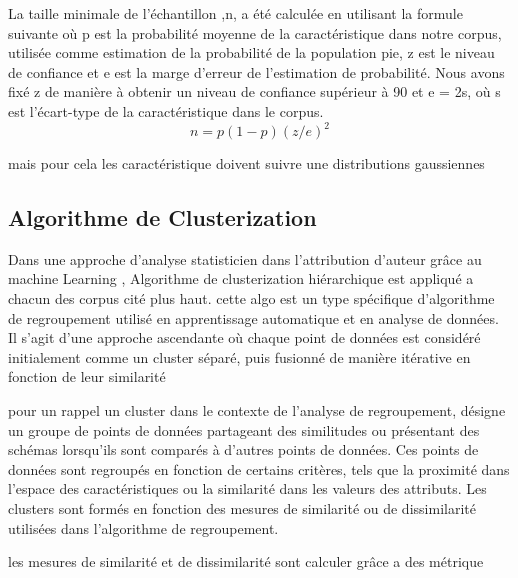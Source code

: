 \documentclass[]{report}
\begin{document}
    La taille minimale de l'échantillon ,n, a été calculée en utilisant la formule suivante
où p est la probabilité moyenne de la caractéristique dans notre corpus, 
utilisée comme estimation de la probabilité de la population pie, 
z est le niveau de confiance et 
e est la marge d'erreur de l'estimation de probabilité.
Nous avons fixé z de manière à obtenir un niveau de confiance supérieur à 90 et 
e = 2s, où s est l'écart-type de la caractéristique dans le corpus.
\[n=p(1-p)(z/e)^2\]

mais pour cela les caractéristique doivent suivre une distributions gaussiennes
\subsection{ Algorithme de Clusterization}

Dans une approche d'analyse statisticien dans l’attribution d’auteur grâce au machine Learning , Algorithme de clusterization hiérarchique est appliqué a chacun des corpus cité plus haut.
cette algo est un type spécifique d'algorithme de regroupement utilisé en apprentissage automatique et en analyse de données. Il s'agit d'une approche ascendante où chaque point de données est considéré initialement comme un cluster séparé, puis fusionné de manière itérative en fonction de leur similarité

pour un rappel un cluster dans le contexte de l'analyse de regroupement, désigne un groupe de points de données partageant des similitudes ou présentant des schémas lorsqu'ils sont comparés à d'autres points de données. Ces points de données sont regroupés en fonction de certains critères, tels que la proximité dans l'espace des caractéristiques ou la similarité dans les valeurs des attributs. Les clusters sont formés en fonction des mesures de similarité ou de dissimilarité utilisées dans l'algorithme de regroupement.

les mesures de similarité et de dissimilarité sont calculer grâce a des métrique
\end{document}
